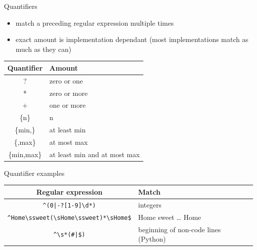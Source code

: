 \documentclass[10pt, graphics, aspectratio=169, table]{beamer}
\begin{document}
    \begin{frame}{Quantifiers}
        \begin{itemize}
            \item match a preceding regular expression multiple times
            \item exact amount is implementation dependant (most implementations match as much as they can)
        \end{itemize}
        \begin{center}
            \begin{tabular}{cl}
                \toprule
                Quantifier & Amount \\
                \midrule
                ? & zero or one \\
                * & zero or more \\
                + & one or more \\
                \{n\} & n \\
                \{min,\} & at least min \\
                \{,max\} & at most max \\
                \{min,max\} & at least min and at most max \\
                \bottomrule
            \end{tabular}
        \end{center}
    \end{frame}

    \begin{frame}[fragile]{Quantifier examples}
        \begin{center}
            \begin{tabular}{cl}
                \toprule
                Regular expression & Match \\
                \midrule
                \verb!^(0|-?[1-9]\d*)!  & integers \\
                \verb!^Home\ssweet(\sHome\ssweet)*\sHome$! & Home sweet \ldots{} Home \\
                \verb!^\s*(#|$)! & beginning of non-code lines (Python) \\
                \bottomrule
            \end{tabular}
        \end{center}
    \end{frame}
\end{document}

